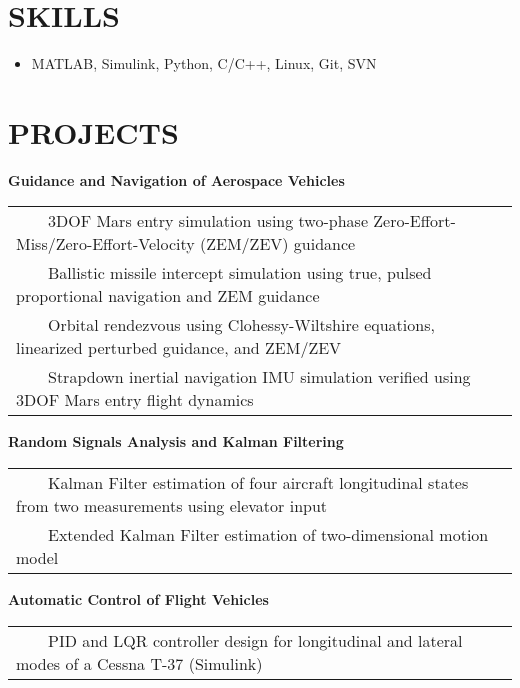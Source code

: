 \documentclass[overlapped, 11pt]{res}
\newcommand{\tabitem}{~~\textbullet~~}
\begin{document}
\begin{resume}
\begin{itemize}
            \section{SKILLS}
            
                \begin{itemize}
                    \item[] MATLAB, Simulink, Python, C/C++, Linux, Git, SVN
                \end{itemize}
                
         \section{PROJECTS}
                
            \textbf{Guidance and Navigation of Aerospace Vehicles} \\
                \begin{tabular}{l}
                    \tabitem 3DOF Mars entry simulation using two-phase Zero-Effort-Miss/Zero-Effort-Velocity (ZEM/ZEV) guidance \\
                    \tabitem Ballistic missile intercept simulation using true, pulsed proportional navigation and ZEM guidance \\
                    \tabitem Orbital rendezvous using Clohessy-Wiltshire equations, linearized perturbed guidance, and ZEM/ZEV\\
                    \tabitem Strapdown inertial navigation IMU simulation verified using 3DOF Mars entry flight dynamics \\
                \end{tabular}

            \textbf{Random Signals Analysis and Kalman Filtering} \\
                \begin{tabular}{l}
                    \tabitem Kalman Filter estimation of four aircraft longitudinal states from two measurements using elevator input\\
                    \tabitem Extended Kalman Filter estimation of two-dimensional motion model\\
                \end{tabular}
                
            \textbf{Automatic Control of Flight Vehicles} \\
                \begin{tabular}{l}
                    \tabitem PID and LQR controller design for longitudinal and lateral modes of a Cessna T-37 (Simulink)\\
                \end{tabular}
                

\end{itemize}
\end{resume}
\end{document}
